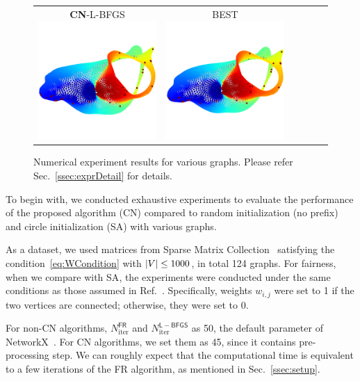 \documentclass[dvipdfmx,10pt,journal,compsoc]{IEEEtran}
\begin{document}
\begin{figure}[btp]
\begin{tabular}{cccccc}
    \makecell{\small{\textsf{\textbf{CN}-L-BFGS}}                                                                                                        \\[-0.2em]\includegraphics[width=0.27\columnwidth]{individual/vis/3elt_CN-L-BFGS.png}} &
    \makecell{\small{\textsf{BEST}}                                                                                                                      \\[-0.2em]\includegraphics[width=0.27\columnwidth]{individual/vis/opt_3elt.png}} \\
  \end{tabular}
  \caption{Numerical experiment results for various graphs.  Please refer Sec.~\ref{ssec:exprDetail} for details.}
  \label{fig:individual}
\end{figure}

To begin with, we conducted exhaustive experiments to evaluate the performance of the proposed algorithm (\textsf{CN}) compared to random initialization (no prefix) and circle initialization (\textsf{SA}) with various graphs.

As a dataset, we used matrices from Sparse Matrix Collection~\cite{davis2011university} satisfying the condition~\eqref{eq:WCondition} with $\abs{V} \leq 1000$, in total 124 graphs.
For fairness, when we compare with \textsf{SA}, the experiments were conducted under the same conditions as those assumed in Ref.~\cite{ghassemitoosiSimulatedAnnealingPreProcessing2016}.
Specifically, weights $w_{i,j}$ were set to 1 if the two vertices are connected; otherwise, they were set to 0.

For non-\textsf{CN} algorithms, $N_\mathrm{iter}^\mathsf{FR}$ and $N_\mathrm{iter}^\mathsf{L-BFGS}$ as 50, the default parameter of NetworkX~\cite{hagberg2008exploring}.
For \textsf{CN} algorithms, we set them as 45, since it contains pre-processing step. We can roughly expect that the computational time is equivalent to a few iterations of the FR algorithm, as mentioned in Sec.~\ref{ssec:setup}.
\end{document}
